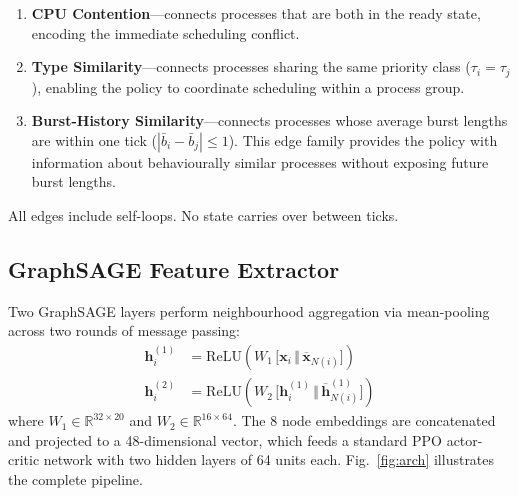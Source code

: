 \documentclass[conference]{IEEEtran}
\begin{document}
\begin{enumerate}
  \item \textbf{CPU Contention}---connects processes that are both in
  the ready state, encoding the immediate scheduling conflict.

  \item \textbf{Type Similarity}---connects processes sharing the same
  priority class ($\tau_i = \tau_j$), enabling the policy to coordinate
  scheduling within a process group.

  \item \textbf{Burst-History Similarity}---connects processes whose
  average burst lengths are within one tick
  ($|\bar{b}_i - \bar{b}_j| \leq 1$).  This edge family provides the
  policy with information about behaviourally similar processes without
  exposing future burst lengths.
\end{enumerate}

All edges include self-loops.  No state carries over between ticks.

\subsection{GraphSAGE Feature Extractor}

Two GraphSAGE layers perform neighbourhood aggregation via mean-pooling
across two rounds of message passing:
\begin{align}
  \mathbf{h}^{(1)}_i &= \mathrm{ReLU}\!\left(W_1\,
    \bigl[\mathbf{x}_i \,\Vert\,
    \overline{\mathbf{x}}_{N(i)}\bigr]\right)\\
  \mathbf{h}^{(2)}_i &= \mathrm{ReLU}\!\left(W_2\,
    \bigl[\mathbf{h}^{(1)}_i \,\Vert\,
    \overline{\mathbf{h}}^{(1)}_{N(i)}\bigr]\right)
\end{align}
where $W_1 \in \mathbb{R}^{32 \times 20}$ and
$W_2 \in \mathbb{R}^{16 \times 64}$.  The 8 node embeddings are
concatenated and projected to a 48-dimensional vector, which feeds a
standard PPO actor-critic network with two hidden layers of 64 units
each.  Fig.~\ref{fig:arch} illustrates the complete pipeline.
\end{document}
